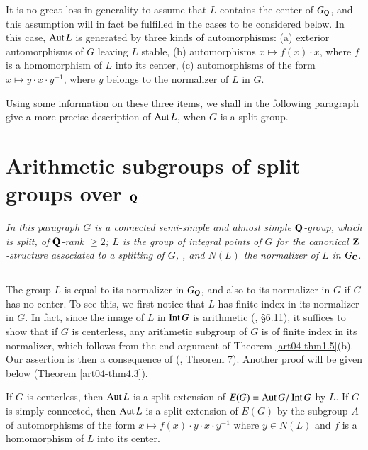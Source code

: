 \begin{remark*}
It is no great loss in generality to assume that $L$ contains the center of $G_{\mathbf{Q}}$, and this assumption will in fact be fulfilled in the cases to be considered below. In this case, $\operatorname{\mathrm{Aut}} L$ is generated by three kinds of automorphisms: (a) exterior automorphisms of $G$ leaving $L$ stable, (b) automorphisms $x\mapsto f(x)\cdot x$, where $f$ is a homomorphism of $L$ into its center, (c) automorphisms of the form $x\mapsto y\cdot x\cdot y^{-1}$, where $y$ belongs to the normalizer of $L$ in $G$.
\end{remark*}

Using some information on these three items, we shall in the following paragraph give a more precise description of $\operatorname{\mathrm{Aut}} L$, when $G$ is a split group.

\section{Arithmetic subgroups of split groups over \texorpdfstring{$\mathbf{Q}$}{Q}}\label{art04-sec2}

{\em In this paragraph $G$ is a connected semi-simple and almost simple $\mathbf{Q}$-group, which is split, of $\mathbf{Q}$-rank $\geq 2$; $L$ is the group of integral points of $G$ for the canonical $\mathbf{Z}$-structure associated to a splitting of $G$\cite{art04-key10}, \cite{art04-key18}, and $N(L)$ the normalizer of $L$ in $G_{\mathbf{C}}$.}

\subsection{}\label{art04-sec2.1}
The group $L$ is equal to its normalizer in $G_{\mathbf{Q}}$, and also to its normalizer in $G$ if $G$ has no center. To see this, we first notice that $L$ has finite index in its normalizer in $G$. In fact, since the image of $L$ in $\operatorname{\mathrm{Int}} G$ is arithmetic (\cite{art04-key7}, \S6.11), it suffices to show that if $G$ is centerless, any arithmetic subgroup of $G$ is of finite index in its normalizer, which follows from the end argument of Theorem \ref{art04-thm1.5}(b). Our assertion is then a consequence of (\cite{art04-key6}, Theorem 7). Another proof will be given below (Theorem \ref{art04-thm4.3}).

\setcounter{theorem}{1}
\begin{theorem}\label{art04-thm2.2}
If $G$ is centerless, then $\operatorname{\mathrm{Aut}} L$ is a split extension of $E(G)=\operatorname{\mathrm{Aut}} G/\operatorname{\mathrm{Int}} G$ by $L$. If $G$ is simply connected, then $\operatorname{\mathrm{Aut}} L$ is a split extension of $E(G)$ by the subgroup $A$ of automorphisms of the form $x\mapsto f(x)\cdot y\cdot x\cdot y^{-1}$ where $y\in N(L)$ and $f$ is a homomorphism of $L$ into its center.
\end{theorem}

